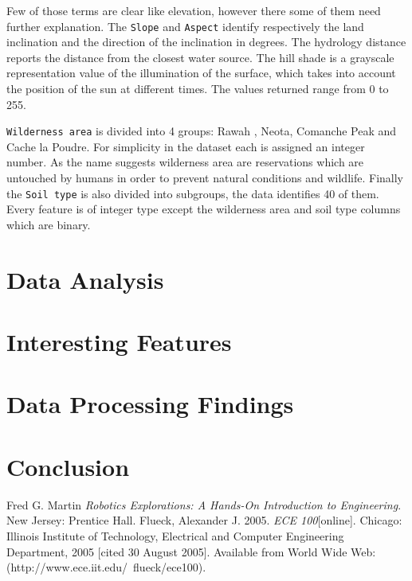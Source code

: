 \documentclass[a4paper, 11pt]{article}
\begin{document}
Few of those terms are clear like elevation, however there some of them need further explanation. The \texttt{Slope} and \texttt{Aspect} identify respectively the land inclination and the direction of the inclination in degrees. The hydrology distance reports the distance from the closest water source. The hill shade is a grayscale representation value of the illumination of the surface, which takes into account the position of the sun at different times. The values returned range from 0 to 255.

\texttt{Wilderness area} is divided into 4 groups: Rawah , Neota, Comanche Peak and Cache la Poudre. For simplicity in the dataset each is assigned an integer number. As the name suggests wilderness area are reservations which are untouched by humans in order to prevent natural conditions and wildlife. Finally the \texttt{Soil type} is also divided into subgroups, the data identifies 40 of them. Every feature is of integer type except the wilderness area and soil type columns which are binary.

\section*{Data Analysis}


\section*{Interesting Features}


\section*{Data Processing Findings}


\section*{Conclusion}


\begin{thebibliography}{9}
 Fred G. Martin \emph{Robotics Explorations: A Hands-On Introduction to Engineering}. New Jersey: Prentice Hall.
  Flueck, Alexander J. 2005. \emph{ECE 100}[online]. Chicago: Illinois Institute of Technology, Electrical and Computer Engineering Department, 2005 [cited 30
August 2005]. Available from World Wide Web: (http://www.ece.iit.edu/~flueck/ece100).
\end{thebibliography}
\end{document}
